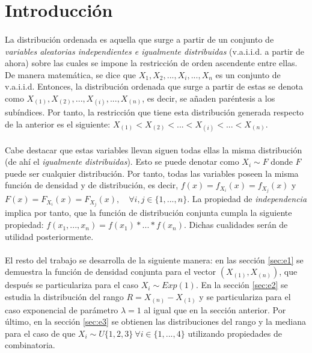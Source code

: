 \documentclass{article}
\begin{document}
  \maketitle


  \section{Introducción}

    \paragraph{}
    La distribución ordenada es aquella que surge a partir de un conjunto de \emph{variables aleatorias independientes e igualmente distribuidas} (v.a.i.i.d. a partir de ahora) sobre las cuales se impone la restricción de orden ascendente entre ellas. De manera matemática, se dice que $X_{1}, X_{2},...,X_{i}, ..., X_{n}$ es un conjunto de v.a.i.i.d. Entonces, la distribución ordenada que surge a partir de estas se denota como $X_{(1)}, X_{(2)}, ...,X_{(i)} ,..., X_{(n)}$, es decir, se añaden paréntesis a los subíndices. Por tanto, la restricción que tiene esta distribución generada respecto de la anterior es el siguiente: $X_{(1)} <  X_{(2)} < ... < X_{(i)} < ... < X_{(n)}$.

    \paragraph{}
    Cabe destacar que estas variables llevan siguen todas ellas la misma distribución (de ahí el \emph{igualmente distribuidas}). Esto se puede denotar como $X_{i} \sim F$ donde $F$ puede ser cualquier distribución. Por tanto, todas las variables poseen la misma función de densidad y de distribución, es decir, $f(x) = f_{X_i}(x) = f_{X_j}(x)$ y $F(x) = F_{X_i}(x) = F_{X_j}(x), \quad \forall i,j \in \{1,..., n\}$. La propiedad de \emph{independencia} implica por tanto, que la función de distribución conjunta cumpla la siguiente propiedad: $f(x_1, ..., x_n) = f(x_1) * ... * f(x_n)$. Dichas cualidades serán de utilidad posteriormente.

    \paragraph{}
    El resto del trabajo se desarrolla de la siguiente manera: en las sección \ref{sec:e1} se demuestra la función de densidad conjunta para el vector $(X_{(1)}, X_{(n)})$, que después se particulariza para el caso $X_i \sim Exp(1)$. En la sección \ref{sec:e2} se estudia la distribución del rango $R = X_{(n)} - X_{(1)}$ y se particulariza para el caso exponencial de parámetro $\lambda=1$ al igual que en la sección anterior. Por último, en la sección \ref{sec:e3} se obtienen las distribuciones del rango y la mediana para el caso de que $X_i \sim U\{1,2,3\} \ \forall i  \in \{1,...,4\}$ utilizando propiedades de combinatoria.
\end{document}
